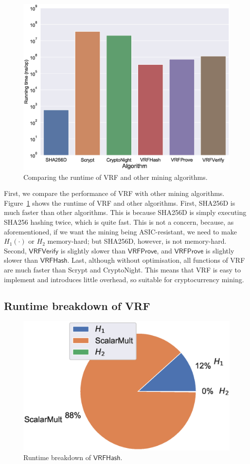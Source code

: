 \begin{figure}[htp]
    \centering
    \includegraphics[width=.7\linewidth]{figs/runtime-comparison.eps}
    \caption{Comparing the runtime of VRF and other mining algorithms.}
    \label{fig:runtime-comparison}
\end{figure}

First, we compare the performance of VRF with other mining algorithms.
Figure~\ref{fig:runtime-comparison} shows the runtime of VRF and other algorithms.
First, SHA256D is much faster than other algorithms.
This is because SHA256D is simply executing SHA256 hashing twice, which is quite fast.
This is not a concern, because,
as aforementioned, if we want the mining being ASIC-resistant, we need to make $H_{1}(\cdot)$ or $H_{2}$ memory-hard; but SHA256D, however, is not memory-hard.
Second, $\mathsf{VRFVerify}$ is slightly slower than $\mathsf{VRFProve}$, and $\mathsf{VRFProve}$ is slightly slower than $\mathsf{VRFHash}$.
Last, although without optimisation, all functions of VRF are much faster than Scrypt and CryptoNight.
This means that VRF is easy to implement and introduces little overhead, so suitable for cryptocurrency mining.



\subsection{Runtime breakdown of VRF}

\begin{figure}[htp]
    \centering
    \includegraphics[width=.7\linewidth]{figs/runtime-breakdown.eps}
    \caption{Runtime breakdown of $\mathsf{VRFHash}$.}
    \label{fig:runtime-breakdown}
\end{figure}

